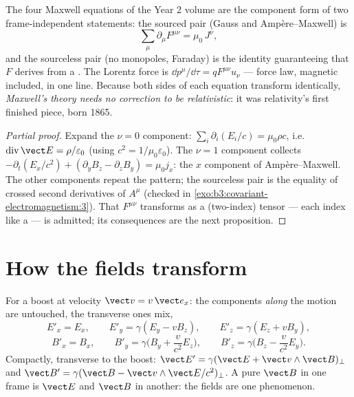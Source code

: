 \begin{theorem}\label{thm:b3:covariant-electromagnetism:maxwell}
The four Maxwell equations of the Year 2 volume are the component
form of two frame-independent statements: the sourced pair
(Gauss and Ampère--Maxwell) is
\[
\sum_\mu \partial_\mu F^{\mu\nu} = \mu_0\,J^\nu ,
\]
and the sourceless pair (no monopoles, Faraday) is the identity
guaranteeing that $F$ derives from a . The Lorentz
force is $\dd p^\mu/\dd\tau = qF^{\mu\nu}u_\nu$ --- force law,
magnetic included, in one line. Because both sides of each equation
transform identically, \emph{Maxwell's theory needs no correction to
be relativistic}: it was relativity's first finished piece, born
1865.
\end{theorem}

\begin{proof}[Partial proof]
Expand the $\nu = 0$ component: $\sum_i\partial_i(E_i/c) =
\mu_0\rho c$, i.e.\ $\operatorname{div}\vect E = \rho/\varepsilon_0$
(using $c^2 = 1/\mu_0\varepsilon_0$). The $\nu = 1$ component
collects $-\partial_t(E_x/c^2) + (\partial_yB_z - \partial_zB_y)
= \mu_0 j_x$: the $x$ component of Ampère--Maxwell. The other
components repeat the pattern; the sourceless pair is the equality of
crossed second derivatives of $A^\mu$ (checked in
\cref{exo:b3:covariant-electromagnetism:3}). That $F^{\mu\nu}$
transforms as a (two-index) tensor --- each index like a 
--- is admitted; its consequences are the next proposition.
\end{proof}

\section{How the fields transform}

\begin{proposition}\label{prop:b3:covariant-electromagnetism:transform}
For a boost at velocity $\vect v = v\,\vect e_x$: the components
\emph{along} the motion are untouched, the transverse ones mix,
\[
E'_x = E_x , \qquad
E'_y = \gamma(E_y - vB_z) , \qquad
E'_z = \gamma(E_z + vB_y) ,
\]
\[
B'_x = B_x , \qquad
B'_y = \gamma\Big(B_y + \frac{v}{c^2}E_z\Big) , \qquad
B'_z = \gamma\Big(B_z - \frac{v}{c^2}E_y\Big) .
\]
Compactly, transverse to the boost: $\vect E' = \gamma(\vect E +
\vect v\wedge\vect B)_\perp$ and $\vect B' = \gamma(\vect B - \vect
v\wedge\vect E/c^2)_\perp$. A pure $\vect B$ in one frame is $\vect
E$ and $\vect B$ in another: the fields are one phenomenon.
\end{proposition}
\admitted

